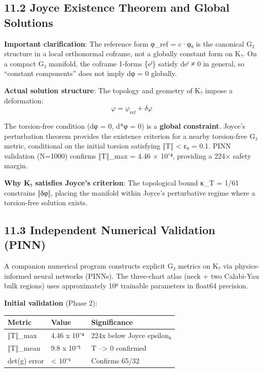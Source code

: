\documentclass[11pt,a4paper]{article}
\begin{document}
\subsection{11.2 Joyce Existence Theorem and Global Solutions}\label{joyce-existence-theorem-and-global-solutions}

\textbf{Important clarification}: The reference form φ\_\allowbreak{}ref = c·φ₀ is the canonical G₂ structure in a local orthonormal coframe, not a globally constant form on K₇. On a compact G₂ manifold, the coframe 1-forms \{eⁱ\} satisfy deⁱ ≠ 0 in general, so ``constant components'' does not imply dφ = 0 globally.

\textbf{Actual solution structure}: The topology and geometry of K₇ impose a deformation: \[\varphi = \varphi_{\text{ref}} + \delta\varphi\]

The torsion-free condition (dφ = 0, d*φ = 0) is a \textbf{global constraint}. Joyce's perturbation theorem provides the existence criterion for a nearby torsion-free G₂ metric, conditional on the initial torsion satisfying ‖T‖ \textless{} ε₀ = 0.1. PINN validation (N=1000) confirms ‖T‖\_\allowbreak{}max = 4.46 × 10⁻⁴, providing a 224× safety margin.

\textbf{Why K₇ satisfies Joyce's criterion}: The topological bound κ\_\allowbreak{}T = 1/61 constrains ‖δφ‖, placing the manifold within Joyce's perturbative regime where a torsion-free solution exists.

\subsection{11.3 Independent Numerical Validation (PINN)}\label{independent-numerical-validation-pinn}

A companion numerical program constructs explicit G₂ metrics on K₇ via physics-informed neural networks (PINNs). The three-chart atlas (neck + two Calabi-Yau bulk regions) uses approximately 10⁶ trainable parameters in float64 precision.

\textbf{Initial validation} (Phase 2):

\begin{longtable}[]{@{}lll@{}}
\toprule\noalign{}
Metric & Value & Significance \\
\midrule\noalign{}
\endhead
\bottomrule\noalign{}
\endlastfoot
‖T‖\_\allowbreak{}max & 4.46 x 10⁻⁴ & 224x below Joyce epsilon₀ \\
‖T‖\_\allowbreak{}mean & 9.8 x 10⁻⁵ & T --\textgreater{} 0 confirmed \\
det(g) error & \textless{} 10⁻⁶ & Confirms 65/32 \\
\end{longtable}
\end{document}
